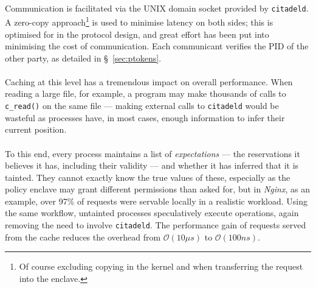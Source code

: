 \paragraph{} Communication is facilitated via the UNIX domain socket provided by \texttt{citadeld}. A zero-copy approach\footnote{Of course excluding copying in the kernel and when transferring the request into the enclave.} is used to minimise latency on both sides; this is optimised for in the protocol design, and great effort has been put into minimising the cost of communication. Each communicant verifies the PID of the other party, as detailed in §~\ref{sec:ptokens}.

\paragraph{} Caching at this level has a tremendous impact on overall performance. When reading a large file, for example, a program may make thousands of calls to \texttt{c\_read()} on the same file --- making external calls to \texttt{citadeld} would be wasteful as processes have, in most cases, enough information to infer their current position.

\paragraph{} To this end, every process  maintains a list of \textit{expectations} --- the reservations it believes it has, including their validity --- and whether it has inferred that it is tainted. They cannot exactly know the true values of these, especially as the policy enclave may grant different permissions than asked for, but in \textit{Nginx}, as an example, over 97\% of requests were servable locally in a realistic workload. Using the same workflow, untainted processes speculatively execute operations, again removing the need to involve \texttt{citadeld}. The performance gain of requests served from the cache reduces the overhead from $\mathcal{O}(10\mu s)$ to $\mathcal{O}(100ns)$.


